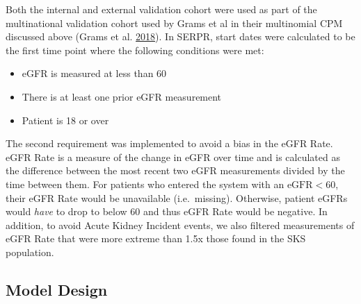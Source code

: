 \documentclass[
]{article}
\providecommand{\tightlist}{%
  \setlength{\itemsep}{0pt}\setlength{\parskip}{0pt}}
\begin{document}
Both the internal and external validation cohort were used as part of the multinational validation cohort used by Grams et al in their multinomial CPM discussed above (Grams et al. \protect\hyperlink{ref-grams_predicting_2018}{2018}). In SERPR, start dates were calculated to be the first time point where the following conditions were met:
\begin{itemize}
\tightlist
\item
  eGFR is measured at less than 60
\item
  There is at least one prior eGFR measurement
\item
  Patient is 18 or over
\end{itemize}
The second requirement was implemented to avoid a bias in the eGFR Rate. eGFR Rate is a measure of the change in eGFR over time and is calculated as the difference between the most recent two eGFR measurements divided by the time between them. For patients who entered the system with an \(\textrm{eGFR} < 60\), their eGFR Rate would be unavailable (i.e.~missing). Otherwise, patient eGFRs would \emph{have} to drop to below 60 and thus eGFR Rate would be negative. In addition, to avoid Acute Kidney Incident events, we also filtered measurements of eGFR Rate that were more extreme than 1.5x those found in the SKS population.

\hypertarget{model-design}{%
\subsection{Model Design}\label{model-design}}
\end{document}
